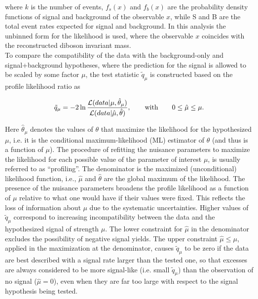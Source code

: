 \noindent where $k$ is the number of events, $f_s(x)$ and $f_b(x)$ are the probability density functions of signal and background of the observable $x$, while S and B are the total event rates expected for signal and background.
In this analysis the unbinned form for the likelihood is used, where the observable $x$ coincides with the reconstructed diboson invariant mass.\\

To compare the compatibility of the data with the background-only and signal+background hypotheses, where the prediction for the signal is allowed to be scaled by some factor $\mu$,
the test statistic $\tilde{q}_\mu$ is constructed based on the profile likelihood ratio as

\begin{equation}\label{eqn:testStatistic}
\tilde{q}_\mu = -2\ln\frac{{\cal L}(data | \mu,\hat{\theta}_\mu)}{{\cal L}( data | \hat{\mu},\hat{\theta})},\qquad \mathrm{with} \qquad 0 \leq \hat{\mu} \leq \mu.
\end{equation}

Here $\hat{\theta}_\mu$ denotes the values of $\theta$ that maximize the likelihood for the hypothesized $\mu$,
i.e. it is the conditional maximum-likelihood (ML) estimator of $\theta$ (and thus is a function of $\mu$). 
The procedure of refitting the nuisance parameters to maximize the likelihood for each possible value of the parameter of interest $\mu$, is usually referred to as ``profiling''.
The denominator is the maximized (unconditional) likelihood function, i.e., $\hat{\mu}$ and $\hat{\theta}$ are the global maximum of the likelihood.
The presence of the nuisance parameters broadens the profile likelihood as a function of $\mu$ relative to what one would have if their values were fixed.
This reflects the loss of information about $\mu$ due to the systematic uncertainties.
Higher values of $\tilde{q}_\mu$ correspond to increasing incompatibility between the data and the hypothesized signal of strength $\mu$.
The lower constraint for $\hat{\mu}$ in the denominator excludes the possibility of negative signal yields. 
The upper constraint $\hat{\mu} \leq \mu$, applied in the maximization at the denominator, causes $\tilde{q}_\mu$ to be zero if the data are best described with a signal rate larger than the tested one, so that excesses are always considered to be more signal-like (i.e. small $\tilde{q}_\mu$) than the observation of no signal ($\hat{\mu} = 0$), even when they are far too large with respect to the signal hypothesis being tested.

